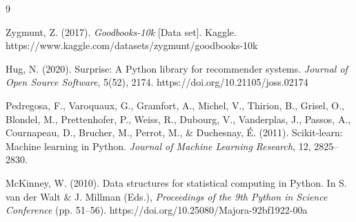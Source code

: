 \documentclass[12pt]{article}
\begin{document}
\begin{thebibliography}{9}

 Zygmunt, Z. (2017). \textit{Goodbooks-10k} [Data set]. Kaggle. https://www.kaggle.com/datasets/zygmunt/goodbooks-10k

 Hug, N. (2020). Surprise: A Python library for recommender systems. \textit{Journal of Open Source Software}, 5(52), 2174. https://doi.org/10.21105/joss.02174

 Pedregosa, F., Varoquaux, G., Gramfort, A., Michel, V., Thirion, B., Grisel, O., Blondel, M., Prettenhofer, P., Weiss, R., Dubourg, V., Vanderplas, J., Passos, A., Cournapeau, D., Brucher, M., Perrot, M., \& Duchesnay, É. (2011). Scikit-learn: Machine learning in Python. \textit{Journal of Machine Learning Research}, 12, 2825–2830.

 McKinney, W. (2010). Data structures for statistical computing in Python. In S. van der Walt \& J. Millman (Eds.), \textit{Proceedings of the 9th Python in Science Conference} (pp. 51–56). https://doi.org/10.25080/Majora-92bf1922-00a

\end{thebibliography}
\end{document}
